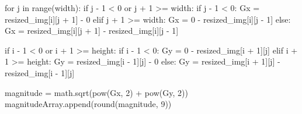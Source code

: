 \documentclass[
  letterpaper,
  DIV=11,
  numbers=noendperiod]{scrreprt}
\newenvironment{Shaded}{\begin{snugshade}}{\end{snugshade}}
\newcommand{\BuiltInTok}[1]{\textcolor[rgb]{0.00,0.23,0.31}{#1}}
\newcommand{\ControlFlowTok}[1]{\textcolor[rgb]{0.00,0.23,0.31}{#1}}
\newcommand{\DecValTok}[1]{\textcolor[rgb]{0.68,0.00,0.00}{#1}}
\newcommand{\KeywordTok}[1]{\textcolor[rgb]{0.00,0.23,0.31}{#1}}
\newcommand{\NormalTok}[1]{\textcolor[rgb]{0.00,0.23,0.31}{#1}}
\newcommand{\OperatorTok}[1]{\textcolor[rgb]{0.37,0.37,0.37}{#1}}
\begin{document}
\begin{Shaded}
\begin{Highlighting}[]
        \ControlFlowTok{for}\NormalTok{ j }\KeywordTok{in} \BuiltInTok{range}\NormalTok{(width):}
            \ControlFlowTok{if}\NormalTok{ j }\OperatorTok{{-}} \DecValTok{1} \OperatorTok{\textless{}} \DecValTok{0} \KeywordTok{or}\NormalTok{ j }\OperatorTok{+} \DecValTok{1} \OperatorTok{\textgreater{}=}\NormalTok{ width:}
                \ControlFlowTok{if}\NormalTok{ j }\OperatorTok{{-}} \DecValTok{1} \OperatorTok{\textless{}} \DecValTok{0}\NormalTok{:}
\NormalTok{                    Gx }\OperatorTok{=}\NormalTok{ resized\_img[i][j }\OperatorTok{+} \DecValTok{1}\NormalTok{] }\OperatorTok{{-}} \DecValTok{0}
                \ControlFlowTok{elif}\NormalTok{ j }\OperatorTok{+} \DecValTok{1} \OperatorTok{\textgreater{}=}\NormalTok{ width:}
\NormalTok{                    Gx }\OperatorTok{=} \DecValTok{0} \OperatorTok{{-}}\NormalTok{ resized\_img[i][j }\OperatorTok{{-}} \DecValTok{1}\NormalTok{]}
            \ControlFlowTok{else}\NormalTok{:}
\NormalTok{                Gx }\OperatorTok{=}\NormalTok{ resized\_img[i][j }\OperatorTok{+} \DecValTok{1}\NormalTok{] }\OperatorTok{{-}}\NormalTok{ resized\_img[i][j }\OperatorTok{{-}} \DecValTok{1}\NormalTok{]}

            \ControlFlowTok{if}\NormalTok{ i }\OperatorTok{{-}} \DecValTok{1} \OperatorTok{\textless{}} \DecValTok{0} \KeywordTok{or}\NormalTok{ i }\OperatorTok{+} \DecValTok{1} \OperatorTok{\textgreater{}=}\NormalTok{ height:}
                \ControlFlowTok{if}\NormalTok{ i }\OperatorTok{{-}} \DecValTok{1} \OperatorTok{\textless{}} \DecValTok{0}\NormalTok{:}
\NormalTok{                    Gy }\OperatorTok{=} \DecValTok{0} \OperatorTok{{-}}\NormalTok{ resized\_img[i }\OperatorTok{+} \DecValTok{1}\NormalTok{][j]}
                \ControlFlowTok{elif}\NormalTok{ i }\OperatorTok{+} \DecValTok{1} \OperatorTok{\textgreater{}=}\NormalTok{ height:}
\NormalTok{                    Gy }\OperatorTok{=}\NormalTok{ resized\_img[i }\OperatorTok{{-}} \DecValTok{1}\NormalTok{][j] }\OperatorTok{{-}} \DecValTok{0}
            \ControlFlowTok{else}\NormalTok{:}
\NormalTok{                Gy }\OperatorTok{=}\NormalTok{ resized\_img[i }\OperatorTok{+} \DecValTok{1}\NormalTok{][j] }\OperatorTok{{-}}\NormalTok{ resized\_img[i }\OperatorTok{{-}} \DecValTok{1}\NormalTok{][j]}

\NormalTok{            magnitude }\OperatorTok{=}\NormalTok{ math.sqrt(}\BuiltInTok{pow}\NormalTok{(Gx, }\DecValTok{2}\NormalTok{) }\OperatorTok{+} \BuiltInTok{pow}\NormalTok{(Gy, }\DecValTok{2}\NormalTok{))}
\NormalTok{            magnitudeArray.append(}\BuiltInTok{round}\NormalTok{(magnitude, }\DecValTok{9}\NormalTok{))}


\end{Highlighting}
\end{Shaded}
\end{document}
